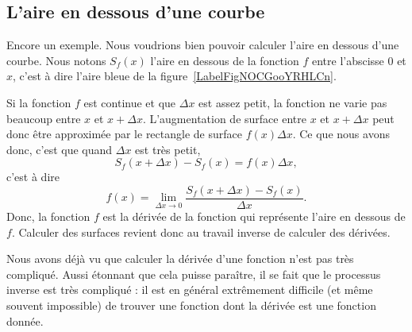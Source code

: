 \newcommand{\CaptionFigLesSubFigures}{Recherche de la tangente par approximations successives.}


\subsection{L'aire en dessous d'une courbe}		\label{SubSecAirePrimInto}

Encore un exemple. Nous voudrions bien pouvoir calculer l'aire en dessous d'une courbe. Nous notons $S_f(x)$ l'aire en dessous de la fonction $f$ entre l'abscisse $0$ et $x$, c'est à dire l'aire bleue de la figure~\ref{LabelFigNOCGooYRHLCn}. %
\newcommand{\CaptionFigNOCGooYRHLCn}{L'aire en dessous d'une courbe. Le rectangle rouge d'aire $f(x)\Delta x$ approxime l'augmentation de l'aire lorsqu'on passe de $x$ à $x+\Delta x$.}


Si la fonction $f$ est continue et que $\Delta x$ est assez petit, la fonction ne varie pas beaucoup entre $x$ et $x+\Delta x$. L'augmentation de surface entre $x$ et $x+\Delta x$ peut donc être approximée par le rectangle de surface $f(x)\Delta x$. Ce que nous avons donc, c'est que quand $\Delta x$ est très petit,
\begin{equation}
	S_f(x+\Delta x)-S_f(x)=f(x)\Delta x,
\end{equation}
c'est à dire
\begin{equation}
	f(x)=\lim_{\Delta x\to 0}\frac{  S_f(x+\Delta x)-S_f(x)}{ \Delta x }.
\end{equation}
Donc, la fonction $f$ est la dérivée de la fonction qui représente l'aire en dessous de $f$. Calculer des surfaces revient donc au travail inverse de calculer des dérivées.

Nous avons déjà vu que calculer la dérivée d'une fonction n'est pas très compliqué. Aussi étonnant que cela puisse paraître, il se fait que le processus inverse est très compliqué : il est en général extrêmement difficile (et même souvent impossible) de trouver une fonction dont la dérivée est une fonction donnée.

